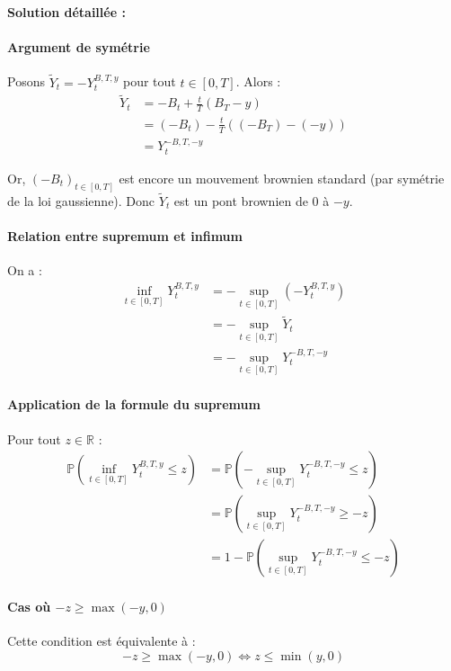 \documentclass[12pt,a4paper]{article}
\theoremstyle{definition}
\theoremstyle{remark}
\newcommand{\R}{\mathbb{R}}
\newcommand{\Prob}{\mathbb{P}}
\begin{document}
\textbf{Solution détaillée :}

\paragraph{Argument de symétrie}

Posons $\tilde{Y}_t = -Y_t^{B,T,y}$ pour tout $t \in [0,T]$. Alors :
\begin{align*}
\tilde{Y}_t &= -B_t + \frac{t}{T}(B_T - y) \\
&= (-B_t) - \frac{t}{T}((-B_T) - (-y)) \\
&= Y_t^{-B,T,-y}
\end{align*}

Or, $(- B_t)_{t \in [0,T]}$ est encore un mouvement brownien standard (par symétrie de la loi gaussienne). Donc $\tilde{Y}_t$ est un pont brownien de $0$ à $-y$.

\paragraph{Relation entre supremum et infimum}

On a :
\begin{align*}
\inf_{t \in [0,T]} Y_t^{B,T,y} &= -\sup_{t \in [0,T]} (-Y_t^{B,T,y}) \\
&= -\sup_{t \in [0,T]} \tilde{Y}_t \\
&= -\sup_{t \in [0,T]} Y_t^{-B,T,-y}
\end{align*}

\paragraph{Application de la formule du supremum}

Pour tout $z \in \R$ :
\begin{align*}
\Prob\left(\inf_{t \in [0,T]} Y_t^{B,T,y} \leq z\right) &= \Prob\left(-\sup_{t \in [0,T]} Y_t^{-B,T,-y} \leq z\right) \\
&= \Prob\left(\sup_{t \in [0,T]} Y_t^{-B,T,-y} \geq -z\right) \\
&= 1 - \Prob\left(\sup_{t \in [0,T]} Y_t^{-B,T,-y} \leq -z\right)
\end{align*}

\paragraph{Cas où $-z \geq \max(-y, 0)$}

Cette condition est équivalente à :
\[
-z \geq \max(-y, 0) \iff z \leq \min(y, 0)
\]
\end{document}
